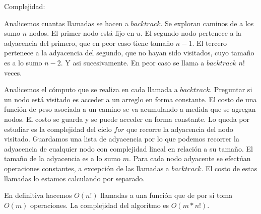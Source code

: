 Complejidad:

Analicemos cuantas llamadas se hacen a $backtrack$. Se exploran caminos de a los sumo $n$ nodos. El primer nodo está fijo en $u$. El segundo nodo
pertenece a la adyacencia del primero, que en peor caso tiene tamaño $n - 1$. El tercero pertenece a la adyacencia del segundo, que no hayan sido
visitados, cuyo tamaño es a lo sumo $n - 2$. Y asi sucesivamente. En peor caso se llama a $backtrack$ $n!$ veces.

Analicemos el cómputo que se realiza en cada llamada a $backtrack$. Preguntar si un nodo está visitado es acceder a un arreglo en forma constante.
El costo de una función de peso asociada a un camino se va acumulando a medida que se agregan nodos. El costo se guarda y se puede acceder en
forma constante. Lo queda por estudiar es la complejidad del ciclo $for$ que recorre la adyacencia del nodo visitado. Guardamos una lista de
adyacencia por lo que podemos recorrer la adyacencia de cualquier nodo con complejidad lineal en relación a su tamaño. El tamaño de la adyacencia
es a lo sumo $m$. Para cada nodo adyacente se efectúan operaciones constantes, a excepción de las llamadas a $backtrack$. El costo de estas
llamadas lo estamos calculando por separado.

En definitiva hacemos $O(n!)$ llamadas a una función que de por si toma $O(m)$ operaciones. La complejidad del algoritmo es $O(m*n!)$.
